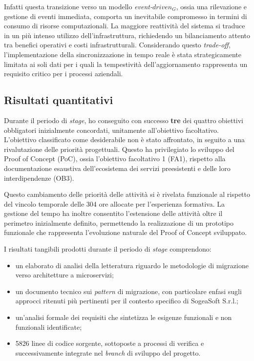         \vspace{0.2 em}
        \noindent Infatti questa transizione verso un modello \textit{event-$driven_G$}, ossia una rilevazione e gestione di eventi immediata, comporta un inevitabile compromesso in termini di consumo di risorse computazionali. La maggiore reattività del sistema si traduce in un più intenso utilizzo dell'infrastruttura, richiedendo un bilanciamento attento tra benefici operativi e costi infrastrutturali. Considerando questo \textit{trade-off}, l'implementazione della sincronizzazione in tempo reale è stata strategicamente limitata ai soli dati per i quali la tempestività dell'aggiornamento rappresenta un requisito critico per i processi aziendali. 

        
        \subsection{Risultati quantitativi}
        Durante il periodo di \textit{stage}, ho conseguito con successo \textbf{tre} dei quattro obiettivi obbligatori inizialmente concordati, unitamente all'obiettivo facoltativo. L'obiettivo classificato come desiderabile non è stato affrontato, in seguito a una rivalutazione delle priorità progettuali. Questo ha privilegiato lo sviluppo del Proof of Concept (PoC), ossia l'obiettivo facoltativo 1 (FA1), rispetto alla documentazione esaustiva dell'ecosistema dei servizi preesistenti e delle loro interdipendenze (OB3).

        \vspace{0.2 em}
        \noindent Questo cambiamento delle priorità delle attività si è rivelata funzionale al rispetto del vincolo temporale delle 304 ore allocate per l'esperienza formativa. La gestione del tempo ha inoltre consentito l'estensione delle attività oltre il perimetro inizialmente definito, permettendo la realizzazione di un prototipo funzionale che rappresenta l'evoluzione naturale del Proof of Concept sviluppato.

        \vspace{0.2 em}
        \noindent I risultati tangibili prodotti durante il periodo di \textit{stage} comprendono:
        \begin{itemize}
            \item un elaborato di analisi della letteratura riguardo le metodologie di migrazione verso architetture a microservizi;
            \item un documento tecnico sui \textit{pattern} di migrazione, con particolare enfasi sugli approcci ritenuti più pertinenti per il contesto specifico di SogeaSoft S.r.l.;
            \item un'analisi formale dei requisiti che sintetizza le esigenze funzionali e non funzionali identificate;
            \item 5826 linee di codice sorgente, sottoposte a processi di verifica e successivamente integrate nel \textit{branch} di sviluppo del progetto.
        \end{itemize}
        
